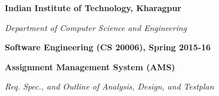 \documentclass{article}
\begin{document}
\thispagestyle{plain}
\setcounter{page}{1}
\begin{center}
{\huge {\bf Indian Institute of Technology, Kharagpur}} 

{\LARGE {\em Department of Computer Science and Engineering}}
\vspace{0.4cm}

{\Large \bf Software Engineering (CS 20006), Spring 2015-16} \vspace{0.1cm}

{\large \bf Assignment Management System (AMS)} \vspace{0.1cm}

{\large \em Req. Spec., and Outline of Analysis, Design, and Testplan} %
\end{center}

\hspace{-1cm}
\end{document}
